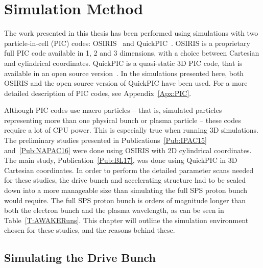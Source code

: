 %
%

\chapter{Simulation Method}
\label{Ch:SimS}

The work presented in this thesis has been performed using simulations with two particle-in-cell (PIC) codes:
OSIRIS~\cite{fonseca:2002} and QuickPIC~\cite{an:2013, huang:2006}.
OSIRIS is a proprietary full PIC code available in 1, 2 and 3 dimensions, with a choice between Cartesian and cylindrical coordinates.
QuickPIC is a quasi-static 3D PIC code, that is available in an open source version~\cite{add:quickpic:web}.
In the simulations presented here, both OSIRIS and the open source version of QuickPIC have been used.
For a more detailed description of PIC codes, see Appendix~\ref{Apx:PIC}.

Although PIC codes use macro particles -- that is, simulated particles representing more than one physical bunch or plasma particle -- these codes require a lot of CPU power.
This is especially true when running 3D simulations.
The preliminary studies presented in Publications~\ref{Pub:IPAC15} and~\ref{Pub:NAPAC16} were done using OSIRIS with 2D cylindrical coordinates.
The main study, Publication~\ref{Pub:BL17}, was done using QuickPIC in 3D Cartesian coordinates.
In order to perform the detailed parameter scans needed for these studies, the drive bunch and accelerating structure had to be scaled down into a more manageable size than simulating the full SPS proton bunch would require.
The full SPS proton bunch is orders of magnitude longer than both the electron bunch and the plasma wavelength, as can be seen in Table~\ref{T:AWAKERuns}.
This chapter will outline the simulation environment chosen for these studies, and the reasons behind these.

\section{Simulating the Drive Bunch}
\label{Sim:PBeam}

